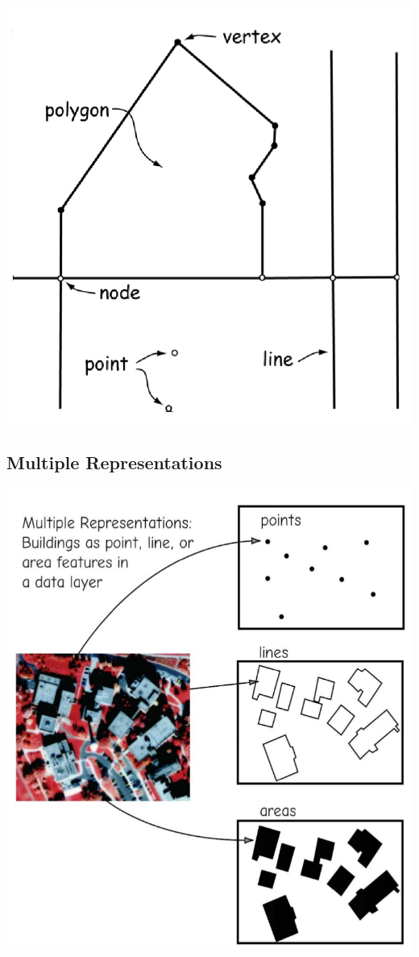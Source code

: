 \documentclass[11pt]{article}
\theoremstyle{definition}
\begin{document}
\includegraphics[width=\textwidth/3]{20.png}

\subsection{Multiple Representations}
\includegraphics[width=\textwidth/3]{21.png}
\end{document}
